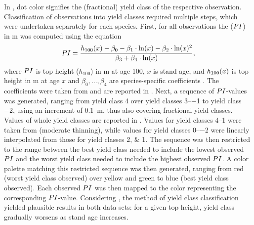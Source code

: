 In , dot color signifies the (fractional) yield class of the respective observation.  Classification of observations into yield classes required multiple steps, which were undertaken separately for each species.  First, for all observations the \ProductivityIndexText{} (\(PI{}\)) in \si{\meter} was computed using the equation
\begin{equation}
  \label{eq:NagelFunctionSolvedForProductivityIndex}
  PI{} = \frac{h_{100}(x) - \beta_0 - \beta_1 \cdot \ln(x) - \beta_2 \cdot \ln(x)^2 }{\beta_3 + \beta_4 \cdot \ln(x)},
\end{equation}
where \(PI{}\) is top height (\(h_{100}\)) in \si{\meter} at age \SI{100}{\year}, \(x\) is stand age, and \(h_{100}(x)\) is top height in \si{\meter} at age \(x\) and \(\beta_0, \ldots, \beta_4\) are species-specific coefficients \parencite{Nagel1999}.  The coefficients were taken from \textcite{Nagel1999} and are reported in .  Next, a sequence of \(PI{}\)-values was generated, ranging from yield class \num{4} over yield classes \numrange{3}{-1} to yield class \num{-2}, using an increment of \SI{0.1}{\meter}, thus also covering fractional yield classes.  Values of whole yield classes are reported in .  Values for yield classes \numrange{4}{1} were taken from \textcite{Schober1995} (moderate thinning), while values for yield classes \numrange{0}{-2} were linearly interpolated from those for yield classes \numlist{2;1}.   The sequence was then restricted to the range between the best yield class needed to include the lowest observed \(PI{}\) and the worst yield class needed to include the highest observed \(PI{}\).  A color palette matching this restricted sequence was then generated, ranging from red (worst yield class observed) over yellow and green to blue (best yield class observed).  Each observed \(PI{}\) was then mapped to the color representing the corresponding \(PI{}\)-value.  Considering , the method of yield class classification yielded plausible results in both data sets:  for a given top height, yield class gradually worsens as stand age increases.

